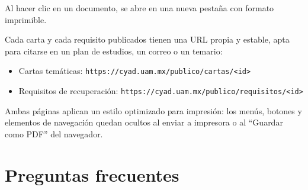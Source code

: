 \documentclass{computacion}
\begin{document}
Al hacer clic en un documento, se abre en una nueva pestaña con formato imprimible.

Cada carta y cada requisito publicados tienen una URL propia y estable, apta para citarse en un plan de estudios, un correo o un temario:

\begin{itemize}
    \item Cartas temáticas: \texttt{https://cyad.uam.mx/publico/cartas/\textless id\textgreater}
    \item Requisitos de recuperación: \texttt{https://cyad.uam.mx/publico/requisitos/\textless id\textgreater}
\end{itemize}

Ambas páginas aplican un estilo optimizado para impresión: los menús, botones y elementos de navegación quedan ocultos al enviar a impresora o al ``Guardar como PDF'' del navegador.

\section{Preguntas frecuentes}
\end{document}
